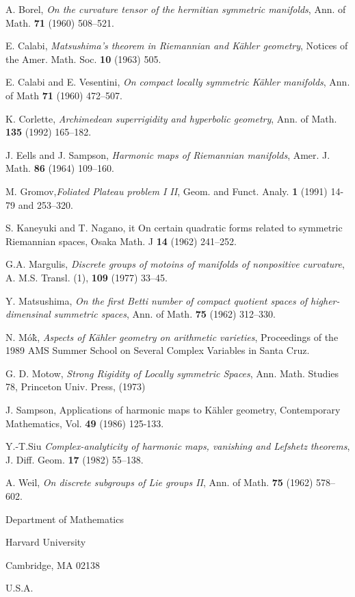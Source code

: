 \begin{thebibliography}{99}
 A. Borel, \textit{On the curvature tensor of the hermitian symmetric manifolds}, Ann. of Math.
{\bf 71} (1960) 508--521.

 E. Calabi, \textit{Matsushima's theorem in Riemannian and K\"ahler geometry}, Notices of the Amer. Math. Soc. {\bf 10} (1963) 505.

 E. Calabi and E. Vesentini, \textit{On compact locally symmetric K\"ahler manifolds}, Ann. of Math {\bf 71} (1960) 472--507.

 K. Corlette, \textit{Archimedean superrigidity and hyperbolic geometry}, Ann. of Math. {\bf 135} (1992) 165--182.

 J. Eells and J. Sampson, \textit{Harmonic maps of Riemannian manifolds}, Amer. J. Math. {\bf 86} (1964) 109--160.

M. Gromov,\pageoriginale \textit{Foliated Plateau problem I II}, Geom. and Funct. Analy. {\bf 1} (1991) 14-79 and 253--320.

 S. Kaneyuki and T. Nagano, it On certain quadratic forms related to symmetric Riemannian spaces, Osaka Math. J {\bf 14} (1962) 241--252.

G.A. Margulis, \textit{Discrete groups of motoins of manifolds of nonpositive curvature}, A. M.S. Transl. (1), {\bf 109} (1977) 33--45.

 Y. Matsushima, \textit{On the first Betti number of compact quotient spaces of higher-dimensinal summetric spaces}, Ann. of Math. {\bf 75} (1962) 312--330.

N. M\'o\`k, \textit{Aspects of K\"ahler geometry on arithmetic varieties}, Proceedings of the 1989 AMS Summer School on Several Complex Variables in Santa Cruz.

 G. D. Motow, \textit{Strong Rigidity of Locally symmetric Spaces}, Ann. Math. Studies 78, Princeton Univ. Press, (1973)

 J. Sampson, Applications of harmonic maps to K\"ahler geometry, Contemporary Mathematics,
Vol. {\bf 49} (1986) 125-133.

Y.-T.Siu \textit{Complex-analyticity of harmonic maps, vanishing and Lefshetz theorems}, J. Diff. Geom. {\bf 17} (1982) 55--138.

A. Weil, \textit{On discrete subgroups of Lie groups II}, Ann. of Math. {\bf 75} (1962) 578--602.
\end{thebibliography}

\bigskip

\begin{flushleft}
Department of Mathematics

Harvard University

Cambridge, MA 02138

U.S.A.
\end{flushleft}
